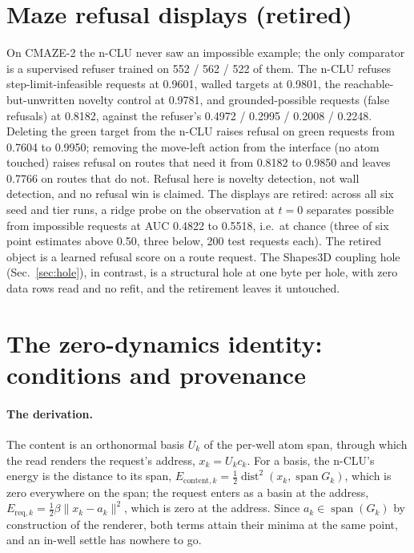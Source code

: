 \documentclass{article} %
\begin{document}
\section{Maze refusal displays (retired)}
\label{app:mazerefusal}

On CMAZE-2 the n-CLU never saw an impossible example; the only comparator is a supervised
refuser trained on 552 / 562 / 522 of them. The n-CLU refuses step-limit-infeasible requests at 0.9601,
walled targets at 0.9801, the reachable-but-unwritten novelty control at 0.9781, and
grounded-possible requests (false refusals) at 0.8182, against the refuser's 0.4972 / 0.2995 /
0.2008 / 0.2248. Deleting the green target from the n-CLU raises refusal on green requests from
0.7604 to 0.9950; removing the move-left action from the interface (no atom touched) raises
refusal on routes that need it from 0.8182 to 0.9850 and leaves 0.7766 on routes that do not.
Refusal here is novelty detection, not wall detection, and no refusal win is claimed. The displays
are retired: across all six seed and tier runs, a ridge probe on the observation at $t=0$ separates
possible from impossible requests at AUC 0.4822 to 0.5518, i.e.\ at chance (three of six point estimates above 0.50, three below, 200 test requests each). The retired object is a learned
refusal score on a route request. The Shapes3D coupling hole (Sec.~\ref{sec:hole}), in contrast, is a
structural hole at one byte per hole, with zero data rows read and no refit, and the retirement
leaves it untouched. %

\section{The zero-dynamics identity: conditions and provenance}
\label{app:clue}

\paragraph{The derivation.} The content is an orthonormal basis $U_k$ of the per-well atom span,
through which the read renders the request's address, $x_k=U_k c_k$. For a basis, the n-CLU's
energy is the distance to its span,
$E_{\text{content},k}=\tfrac12\operatorname{dist}^2(x_k,\operatorname{span}G_k)$, which is zero
everywhere on the span; the request enters as a basin at the address, $E_{\text{req},k}=\tfrac12\beta\lVert
x_k-a_k\rVert^2$, which is zero at the address. Since $a_k\in\operatorname{span}(G_k)$ by
construction of the renderer, both terms attain their minima at the same point, and an in-well
settle has nowhere to go.
\end{document}
